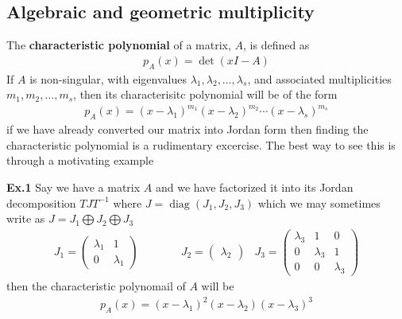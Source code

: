 \documentclass[a4paper,11pt]{exam}
\newcounter{ct}
\DeclareMathOperator*{\diag}{diag}
\begin{document}
\begin{questions}
\subsection{Algebraic and geometric multiplicity}
The \textbf{characteristic polynomial} of a matrix, $A$, is defined as
\begin{align}
    p_A(x) = \det (xI - A)
\end{align}
If $A$ is non-singular, with eigenvalues $\lambda_1, \lambda_2, \ldots, \lambda_s$, and associated multiplicities $m_1, m_2, \ldots, m_s$, then its characterisitc polynomial will be of the form
\begin{align}
    p_A(x) = (x - \lambda_1)^{m_1} (x - \lambda_2)^{m_2} \cdots (x - \lambda_s)^{m_s}
\end{align}
if we have already converted our matrix into Jordan form then finding the characteristic polynomial is a rudimentary excercise.  The best way to see this is through a motivating example
\begin{tcolorbox}[colback=black!1!,title=From Jordan form to characteristic polynomial]
    \textbf{Ex.1} Say we have a matrix $A$ and we have factorized it into its Jordan decomposition $T J T^{-1}$ where $J = \diag(J_1, J_2, J_3)$ which we may sometimes write as $J = J_1 \bigoplus J_2 \bigoplus J_3$
    \begin{align}
        J_1 = \begin{pmatrix} \lambda_1 & 1\\0 & \lambda_1 \end{pmatrix} & \qquad\quad
        J_2 = \begin{pmatrix} \lambda_2 \end{pmatrix} &  
        J_3 = \begin{pmatrix} \lambda_3 & 1 & 0 \\ 0 & \lambda_3 & 1 \\ 0 & 0 & \lambda_3 \end{pmatrix}
    \end{align}
    then the characteristic polynomail of $A$ will be
    \begin{align}
        p_A(x) = (x - \lambda_1)^2 (x - \lambda_2) (x - \lambda_3)^3
    \end{align}


\end{tcolorbox}
\end{questions}
\end{document}

